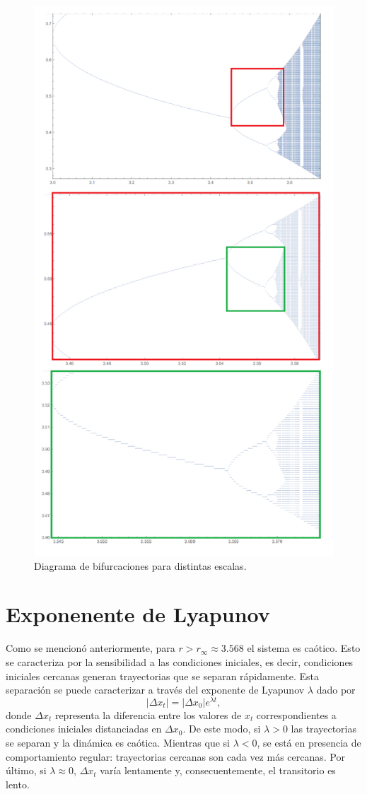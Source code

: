 \documentclass[aps,prb,twocolumn,superscriptaddress,floatfix,longbibliography]{revtex4-2}
\newcounter{para}
\begin{document}
\begin{figure}[htp]
    \includegraphics[clip=true,width=0.6\columnwidth]{c_diag_bif_rs.png}
    \caption{Diagrama de bifurcaciones para distintas escalas.}
     \label{fig:c_diag_bif_rs}
\end{figure}

\section{\label{sec:d}Exponenente de Lyapunov}

Como se mencionó anteriormente, para $r > r_\infty \approx 3.568$ el sistema es caótico. Esto se caracteriza por la sensibilidad a las condiciones iniciales, es decir, condiciones iniciales cercanas generan trayectorias que se separan rápidamente. Esta separación se puede caracterizar a través del exponente de Lyapunov $\lambda$ dado por
\[ |\Delta x_t | = |\Delta x_0 | e^{\lambda t},\]
donde $\Delta x_t$ representa la diferencia entre los valores de $x_t$ correspondientes a condiciones iniciales distanciadas en $\Delta x_0$. De este modo, si $\lambda > 0$ las trayectorias se separan y la dinámica es caótica. Mientras que si $\lambda < 0$, se está en presencia de comportamiento regular: trayectorias cercanas son cada vez más cercanas. Por último, si $\lambda \approx 0$, $\Delta x_t$ varía lentamente y, consecuentemente, el transitorio es lento.
\end{document}
